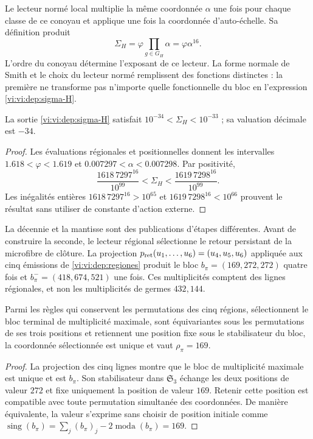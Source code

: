 Le lecteur normé local multiplie la même coordonnée \(\alpha\)
une fois pour chaque classe de ce conoyau et applique une fois la coordonnée
d’auto-échelle. Sa définition produit
\begin{equation}
 \Sigma_H=\varphi\prod_{g\in G_H}\alpha
         =\varphi\alpha^{16}.
 \label{vi:vi:dep:sigma-H}
\end{equation}
L’ordre du conoyau détermine l’exposant de ce lecteur. La forme
normale de Smith et le choix du lecteur normé remplissent des fonctions
distinctes : la première ne transforme pas n’importe quelle fonctionnelle du bloc en
l’expression \eqref{vi:vi:dep:sigma-H}.

\begin{proposition}
\label{vi:vi:dep:decada}
La sortie \eqref{vi:vi:dep:sigma-H} satisfait
\(10^{-34}<\Sigma_H<10^{-33}\) ; sa valuation décimale est \(-34\).
\end{proposition}
\begin{proof}
Les évaluations régionales et positionnelles donnent les intervalles
\(1.618<\varphi<1.619\) et \(0.007297<\alpha<0.007298\).
Par positivité,
\[
 \frac{1618\,7297^{16}}{10^{99}}
 <\Sigma_H<
 \frac{1619\,7298^{16}}{10^{99}}.
\]
Les inégalités entières
\(1618\,7297^{16}>10^{65}\) et
\(1619\,7298^{16}<10^{66}\) prouvent le résultat sans utiliser de
constante d’action externe.
\end{proof}

La décennie et la mantisse sont des publications d'étapes différentes.
Avant de construire la seconde, le lecteur régional sélectionne le retour
persistant de la microfibre de clôture. La projection
\(p_{\rm ret}(u_1,\ldots,u_6)=(u_4,u_5,u_6)\) appliquée aux
cinq émissions de \ref{vi:vi:dep:regiones} produit le bloc
\(b_\pi=(169,272,272)\) quatre fois et
\(b_\pi^-=(418,674,521)\) une fois. Ces multiplicités comptent
des lignes régionales, et non les multiplicités de germes \(432,144\).

\begin{proposition}
\label{vi:vi:dep:selector169}
Parmi les règles qui conservent les permutations des cinq régions,
sélectionnent le bloc terminal de multiplicité maximale, sont équivariantes
sous les permutations de ses trois positions et retiennent une position fixe
sous le stabilisateur du bloc, la coordonnée sélectionnée est unique
et vaut \(\rho_\pi=169\).
\end{proposition}
\begin{proof}
La projection des cinq lignes montre que le bloc de multiplicité
maximale est unique et est \(b_\pi\). Son stabilisateur dans
\(\mathfrak S_3\) échange les deux positions de valeur \(272\)
et fixe uniquement la position de valeur \(169\). Retenir cette position
est compatible avec toute permutation simultanée des coordonnées.
De manière équivalente, la valeur s’exprime sans choisir de position initiale
comme
\(\operatorname{sing}(b_\pi)=\sum_j(b_\pi)_j
-2\operatorname{moda}(b_\pi)=169\).
\end{proof}

